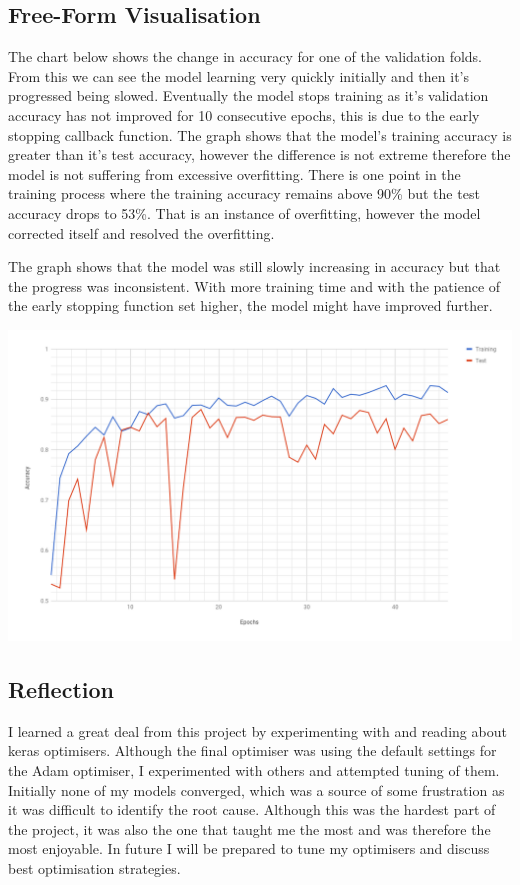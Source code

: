 \documentclass{article}
\begin{document}
\subsection{Free-Form Visualisation}
The chart below shows the change in accuracy for one of the validation folds. From this we can see the model learning very quickly initially and then it's progressed being slowed. Eventually the model stops training as it's validation accuracy has not improved for 10 consecutive epochs, this is due to the early stopping callback function. The graph shows that the model's training accuracy is greater than it's test accuracy, however the difference is not extreme therefore the model is not suffering from excessive overfitting. There is one point in the training process where the training accuracy remains above 90\% but the test accuracy drops to 53\%. That is an instance of overfitting, however the model corrected itself and resolved the overfitting.

The graph shows that the model was still slowly increasing in accuracy but that the progress was inconsistent. With more training time and with the patience of the early stopping function set higher, the model might have improved further. 

\includegraphics[scale=0.25]{accuracy-chart}

\subsection{Reflection}
I learned a great deal from this project by experimenting with and reading about keras optimisers. Although the final optimiser was using the default settings for the Adam optimiser, I experimented with others and attempted tuning of them. Initially none of my models converged, which was a source of some frustration as it was difficult to identify the root cause. Although this was the hardest part of the project, it was also the one that taught me the most and was therefore the most enjoyable. In future I will be prepared to tune my optimisers and discuss best optimisation strategies. 
\end{document}
